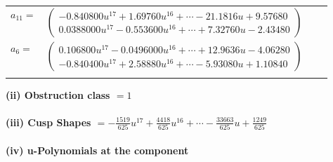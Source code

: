 \documentclass[1p]{elsarticle_modified}
\theoremstyle{definition}
\begin{document}
\begin{tabular}{m{7pt} m{180pt} m{7pt} m{180pt} }
\flushright $a_{11}=$&$\begin{pmatrix}-0.840800 u^{17}+1.69760 u^{16}+\cdots-21.1816 u+9.57680\\0.0388000 u^{17}-0.553600 u^{16}+\cdots+7.32760 u-2.43480\end{pmatrix}$ \\
\flushright $a_{6}=$&$\begin{pmatrix}0.106800 u^{17}-0.0496000 u^{16}+\cdots+12.9636 u-4.06280\\-0.840400 u^{17}+2.58880 u^{16}+\cdots-5.93080 u+1.10840\end{pmatrix}$\\&\end{tabular}
\flushleft \textbf{(ii) Obstruction class $= 1$}\\~\\
\flushleft \textbf{(iii) Cusp Shapes $= -\frac{1519}{625} u^{17}+\frac{4418}{625} u^{16}+\cdots-\frac{33663}{625} u+\frac{1249}{625}$}\\~\\
\newpage\renewcommand{\arraystretch}{1}
\flushleft \textbf{(iv) u-Polynomials at the component}\newline \\
\end{document}
